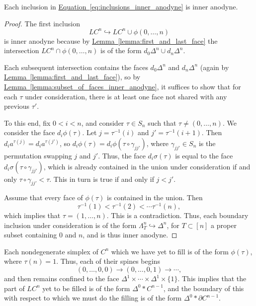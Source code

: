 \documentclass[main.tex]{subfiles}
\begin{document}
\begin{proposition}
  \label{prop:inner_anodyne_cube_filling}
  Each inclusion in \hyperref[eq:inclusions_inner_anodyne]{Equation~\ref*{eq:inclusions_inner_anodyne}} is inner anodyne.
\end{proposition}
\begin{proof}
  The first inclusion
  \begin{equation*}
    LC^{n} \hookrightarrow LC^{n} \cup \phi(0, \ldots, n)
  \end{equation*}
  is inner anodyne because by \hyperref[lemma:first_and_last_face]{Lemma~\ref*{lemma:first_and_last_face}} the intersection $LC^{n} \cap \phi(0, \ldots, n)$ is of the form $d_{0}\Delta^{n} \cup d_{n} \Delta^{n}$.

  Each subsequent intersection contains the faces $d_{0}\Delta^{n}$ and $d_{n}\Delta^{n}$ (again by \hyperref[lemma:first_and_last_face]{Lemma~\ref*{lemma:first_and_last_face}}), so by \hyperref[lemma:subset_of_faces_inner_anodyne]{Lemma~\ref*{lemma:subset_of_faces_inner_anodyne}}, it suffices to show that for each $\tau$ under consideration, there is at least one face not shared with any previous $\tau'$.

  To this end, fix $0 < i < n$, and consider $\tau \in S_{n}$ such that $\tau \neq (0, \ldots, n)$. We consider the face $d_{i}\phi(\tau)$. Let $j = \tau^{-1}(i)$ and $j' = \tau^{-1}(i+1)$. Then $d_{i} a^{\tau(j)} = d_{i}a^{\tau(j')}$, so $d_{i} \phi(\tau) = d_{i}\phi(\tau \circ \gamma_{jj'})$, where $\gamma_{jj'} \in S_{n}$ is the permutation swapping $j$ and $j'$. Thus, the face $d_{i}\sigma(\tau)$ is equal to the face $d_{i}\sigma(\tau \circ \gamma_{jj'})$, which is already contained in the union under consideration if and only $\tau \circ \gamma_{jj'} < \tau$. This in turn is true if and only if $j < j'$.

  Assume that every face of $\phi(\tau)$ is contained in the union. Then
  \begin{equation*}
    \tau^{-1}(1) < \tau^{-1}(2) < \cdots \tau^{-1}(n),
  \end{equation*}
  which implies that $\tau = (1, \ldots, n)$. This is a contradiction. Thus, each boundary inclusion under consideration is of the form $\Lambda^{n}_{T} \hookrightarrow \Delta^{n}$, for $T \subset [n]$ a proper subset containing 0 and $n$, and is thus inner anodyne.
\end{proof}

Each nondegenerate simplex of $C^{n}$ which we have yet to fill is of the form $\phi(\tau)$, where $\tau(n) = 1$. Thus, each of their spines begins
\begin{equation*}
  (0, \ldots, 0, 0) \to (0, \ldots, 0, 1) \to \cdots,
\end{equation*}
and then remains confined to the face $\Delta^{1} \times \cdots \times \Delta^{1} \times \{1\}$. This implies that the part of $LC^{n}$ yet to be filled is of the form $\Delta^{0} \ast C^{n-1}$, and the boundary of this with respect to which we must do the filling is of the form $\Delta^{0} \ast \partial C^{n-1}$.
\end{document}
